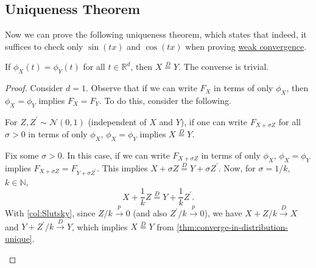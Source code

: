 \subsection{Uniqueness Theorem}
Now we can prove the following uniqueness theorem, which states that indeed, it suffices to check only \(\sin (tx)\) and \(\cos (tx)\) when proving \hyperref[def:converge-weakly]{weak convergence}.

\begin{theorem}[Uniqueness]\label{thm:characteristic-function-uniqueness}
	If \(\phi _X(t) = \phi _Y(t)\) for all \(t\in \mathbb{R} ^d\), then \(X\overset{D}{=} Y\). The converse is trivial.
\end{theorem}
\begin{proof}
	Consider \(d = 1\). Observe that if we can write \(F_X\) in terms of only \(\phi _X\), then \(\phi _X = \phi _Y\) implies \(F_X = F_Y\). To do this, consider the following.

	\begin{claim}
		For \(Z, Z^{\prime} \sim \mathcal{N} (0, 1)\) (independent of \(X\) and \(Y\)), if one can write \(F_{X + \sigma Z}\) for all \(\sigma > 0\) in terms of only \(\phi _X\), \(\phi _X = \phi _Y\) implies \(X \overset{D}{=} Y\).
	\end{claim}
	\begin{explanation}
		Fix some \(\sigma > 0\). In this case, if we can write \(F_{X + \sigma Z}\) in terms of only \(\phi _X\), \(\phi _X = \phi _Y\) implies \(F_{X + \sigma Z} = F_{Y + \sigma Z^{\prime} }\). This implies \(X + \sigma Z \overset{D}{=} Y + \sigma Z^{\prime} \). Now, for \(\sigma = 1 / k\), \(k \in \mathbb{N} \),
		\[
			X + \frac{1}{k} Z \overset{D}{=} Y + \frac{1}{k} Z^{\prime} .
		\]
		With \autoref{col:Slutsky}, since \(Z / k \overset{p}{\to } 0\) (and also \(Z^{\prime} / k \overset{p}{\to } 0\)), we have \(X + Z / k \overset{D}{\to } X\) and \(Y + Z^{\prime} / k \overset{D}{\to } Y\), which implies \(X \overset{D}{=} Y\) from \autoref{thm:converge-in-distribution-unique}.
	\end{explanation}


\end{proof}
